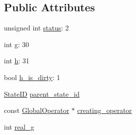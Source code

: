 \subsection*{Public Attributes}
\begin{DoxyCompactItemize}
\item 
unsigned int \hyperlink{structSearchNodeInfo_ad59aab13c817bc5fa13b09fcfaef6e36}{status}\-: 2
\item 
int \hyperlink{structSearchNodeInfo_a822efe4485b26c0f11c42fb85177a03b}{g}\-: 30
\item 
int \hyperlink{structSearchNodeInfo_afb8e1a40836bac71ccde5e1ff1b63cea}{h}\-: 31
\item 
bool \hyperlink{structSearchNodeInfo_ad39a4374ed651a04b4a580efa601c6a3}{h\-\_\-is\-\_\-dirty}\-: 1
\item 
\hyperlink{classStateID}{State\-I\-D} \hyperlink{structSearchNodeInfo_a6d9f3641136126b5e4bcaac4b183aa75}{parent\-\_\-state\-\_\-id}
\item 
const \hyperlink{classGlobalOperator}{Global\-Operator} $\ast$ \hyperlink{structSearchNodeInfo_a00ac98dc0a849cdc798a382c992b3494}{creating\-\_\-operator}
\item 
int \hyperlink{structSearchNodeInfo_acd8ef58c8ed2912745204729d02417d7}{real\-\_\-g}
\end{DoxyCompactItemize}


